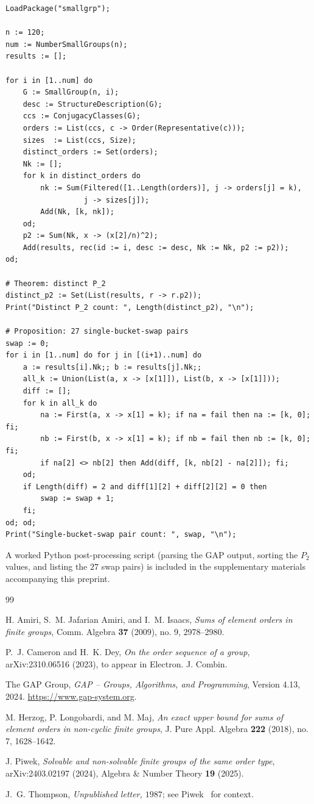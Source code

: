 \documentclass[11pt]{amsart}
\theoremstyle{plain}
\theoremstyle{definition}
\begin{document}
\begin{verbatim}
LoadPackage("smallgrp");

n := 120;
num := NumberSmallGroups(n);
results := [];

for i in [1..num] do
    G := SmallGroup(n, i);
    desc := StructureDescription(G);
    ccs := ConjugacyClasses(G);
    orders := List(ccs, c -> Order(Representative(c)));
    sizes  := List(ccs, Size);
    distinct_orders := Set(orders);
    Nk := [];
    for k in distinct_orders do
        nk := Sum(Filtered([1..Length(orders)], j -> orders[j] = k),
                  j -> sizes[j]);
        Add(Nk, [k, nk]);
    od;
    p2 := Sum(Nk, x -> (x[2]/n)^2);
    Add(results, rec(id := i, desc := desc, Nk := Nk, p2 := p2));
od;

# Theorem: distinct P_2
distinct_p2 := Set(List(results, r -> r.p2));
Print("Distinct P_2 count: ", Length(distinct_p2), "\n");

# Proposition: 27 single-bucket-swap pairs
swap := 0;
for i in [1..num] do for j in [(i+1)..num] do
    a := results[i].Nk;; b := results[j].Nk;;
    all_k := Union(List(a, x -> [x[1]]), List(b, x -> [x[1]]));
    diff := [];
    for k in all_k do
        na := First(a, x -> x[1] = k); if na = fail then na := [k, 0]; fi;
        nb := First(b, x -> x[1] = k); if nb = fail then nb := [k, 0]; fi;
        if na[2] <> nb[2] then Add(diff, [k, nb[2] - na[2]]); fi;
    od;
    if Length(diff) = 2 and diff[1][2] + diff[2][2] = 0 then
        swap := swap + 1;
    fi;
od; od;
Print("Single-bucket-swap pair count: ", swap, "\n");
\end{verbatim}

A worked Python post-processing script (parsing the GAP output, sorting the $P_2$ values, and listing the $27$ swap pairs) is included in the supplementary materials accompanying this preprint.

\begin{thebibliography}{99}

H. Amiri, S.~M. Jafarian Amiri, and I.~M. Isaacs,
\emph{Sums of element orders in finite groups},
Comm. Algebra \textbf{37} (2009), no. 9, 2978--2980.

P.~J. Cameron and H.~K. Dey,
\emph{On the order sequence of a group},
arXiv:2310.06516 (2023), to appear in Electron. J. Combin.

The GAP Group,
\emph{GAP -- Groups, Algorithms, and Programming},
Version 4.13, 2024. \url{https://www.gap-system.org}.

M. Herzog, P. Longobardi, and M. Maj,
\emph{An exact upper bound for sums of element orders in non-cyclic finite groups},
J. Pure Appl. Algebra \textbf{222} (2018), no. 7, 1628--1642.

J. Piwek,
\emph{Solvable and non-solvable finite groups of the same order type},
arXiv:2403.02197 (2024), Algebra \& Number Theory \textbf{19} (2025).

J.~G. Thompson,
\emph{Unpublished letter, $1987$};
see Piwek~\cite{Piwek2024} for context.

\end{thebibliography}
\end{document}
